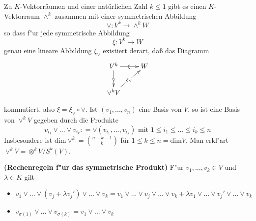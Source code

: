 \documentclass[8pt, a4paper, twocolumn, landscape]{article}
\begin{document}
\begin{theorem}
Zu $K$-Vektorräumen und einer natürlichen Zahl $k \leq 1$ gibt es einen $K$-Vektorraum
$\wedge^k$  zusammen mit einer symmetrischen Abbildung 
$$
\vee: V^k \rightarrow \wedge ^k W
$$
so dass f"ur jede symmetrische Abbildung 
$$
\xi: V^k \rightarrow W
$$
genau eine lineare Abbildung $\xi_{\vee}$ existiert derart, daß das Diagramm 
\begin{gather*}
\xymatrix{V^k   \ar[d]|{\vee} \ar[r]|{\xi} & W\\
\vee^k V \ar[ur]|{\xi_\vee} & }
\end{gather*}

kommutiert, also $\xi = \xi_\vee \circ \vee$. Ist $(v_1,...,v_n)$ eine Basis von $V$, so ist eine Basis von $\vee^k V$ gegeben durch die Produkte 
$$
v_{i_1} \vee ... \vee v_{i_k} : =  \vee (v_{i_1}, ..., v_{i_k}) \text{ mit } 1 \leq i_1 \leq ... \leq  i_k \leq n
$$
Insbesondere ist $\mathrm{dim}\vee^k = \binom{n+k-1}{k}$ für $ 1 \leq k \leq n = \mathrm{dim}V$. 
Man erkl"art \\ $\vee^k V = \otimes^k V / S^k(V)$.
\end{theorem}


\begin{remark}\textbf{(Rechenregeln f"ur das symmetrische Produkt)}
F"ur $v_1, ..., v_k \in V$ und $\lambda \in K$ gilt
\begin{itemize}
\item $v_1 \vee ... \vee (v_j + \lambda v_j') \vee ... \vee v_k = v_1 \vee ... \vee v_j \vee ... \vee v_k + \lambda v_1 \vee ... \vee v_j' \vee ... \vee v_k$
\item $v_{\sigma(1)} \vee ... \vee v_{\sigma(k)} = v_1 \vee ... \vee v_k$
\end{itemize}
\end{remark}

\end{document}
